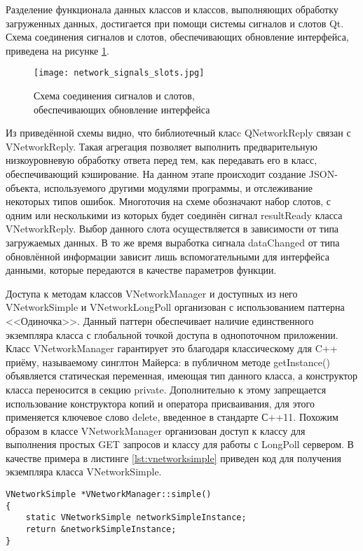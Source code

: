 Разделение функционала данных классов и классов, выполняющих обработку
загруженных данных, достигается при помощи системы сигналов и слотов Qt.
Схема соединения сигналов и слотов, обеспечивающих обновление интерфейса,
приведена на рисунке \ref{fig:network_signals_slots}.

\begin{figure}
\centering
	\texttt{[image: network\_signals\_slots.jpg]}
	\caption{Схема соединения сигналов и слотов, \\ обеспечивающих обновление
	интерфейса}
	\label{fig:network_signals_slots}
\end{figure}

Из приведённой схемы видно, что библиотечный класc QNetworkReply связан с
VNetworkReply. Такая агрегация позволяет выполнить предварительную
низкоуровневую обработку ответа перед тем, как передавать его в класс,
обеспечивающий кэширование. На данном этапе происходит создание JSON-объекта,
используемого другими модулями программы, и отслеживание некоторых типов ошибок.
Многоточия на схеме обозначают набор слотов, с одним или несколькими из которых
будет соединён сигнал resultReady класса VNetworkReply. Выбор данного слота
осуществляется в зависимости от типа загружаемых данных. В то же время выработка
сигнала dataChanged от типа обновлённой информации зависит лишь вспомогательными
для интерфейса данными, которые передаются в качестве параметров функции.

Доступа к методам классов VNetworkManager и доступных из него VNetworkSimple и
VNetworkLongPoll организован с использованием паттерна <<Одиночка>>.
Данный паттерн обеспечивает наличие единственного экземпляра класса с глобальной
точкой доступа в однопоточном приложении. Класс VNetworkManager гарантирует это
благодаря классическому для C++ приёму, называемому синглтон Майерса: в
публичном методе getInstance() объявляется статическая переменная, имеющая тип
данного класса, а конструктор класса переносится в секцию private. Дополнительно
к этому запрещается использование конструктора копий и оператора присваивания,
для этого применяется ключевое слово delete, введенное в стандарте С++11.
Похожим образом в классе VNetworkManager организован доступ к классу для
выполнения простых GET запросов и классу для работы с LongPoll сервером. В
качестве примера в листинге \ref{lst:vnetworksimple} приведен код для получения
экземпляра класса VNetworkSimple.

\begin{lstlisting}[style = cstyle, 
				   caption = {Получение экземпляра класса VNetworkSimple},
				   label = lst:vnetworksimple] 
VNetworkSimple *VNetworkManager::simple()
{
	static VNetworkSimple networkSimpleInstance;
	return &networkSimpleInstance;
}
\end{lstlisting}

